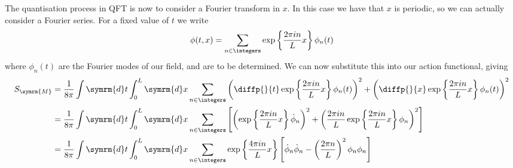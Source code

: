 \documentclass[fleqn]{NotesClass}
\renewcommand{\dl}[1]{\symrm{d}#1}
\newcommand{\minkowski}{\symrm{M}}
\begin{document}
    The quantisation process in QFT is now to consider a Fourier transform in \(x\).
    In this case we have that \(x\) is periodic, so we can actually consider a Fourier series.
    For a fixed value of \(t\) we write
    \begin{equation}
        \phi(t, x) = \sum_{n \in \integers} \exp\left\{ \frac{2\pi in}{L}x \right\} \phi_n(t)
    \end{equation}
    where \(\phi_n(t)\) are the Fourier modes of our field, and are to be determined.
    We can now substitute this into our action functional, giving
    \begin{align}
        S_{\minkowski} &= \frac{1}{8\pi} \int \dl{t} \int_0^L \dl{x} \sum_{n \in \integers} \left( \diffp{}{t}\exp\left\{ \frac{2\pi i n}{L}x\right\} \phi_n(t) \right)^2 + \left( \diffp{}{x}\exp\left\{ \frac{2\pi i n}{L}x \right\}\phi_n(t) \right)^2\\
        &= \frac{1}{8\pi} \int \dl{t} \int_0^L \dl{x} \sum_{n \in \integers} \left[ \left( \exp\left\{ \frac{2\pi i n}{L}x \right\} \dot{\phi}_n \right)^2 + \left( \frac{2\pi i n}{L} \exp\left\{ \frac{2\pi i n}{L} x \right\} \phi_n \right)^2 \right]\\
        &= \frac{1}{8\pi} \int \dl{t} \int_0^L \dl{x} \sum_{n \in \integers} \exp\left\{ \frac{4\pi in}{L}x \right\} \left[\dot{\phi}_n\dot{\phi}_n - \left( \frac{2\pi n}{L} \right)^2 \phi_n \phi_n \right]
    \end{align}
    
    
    
\end{document}
